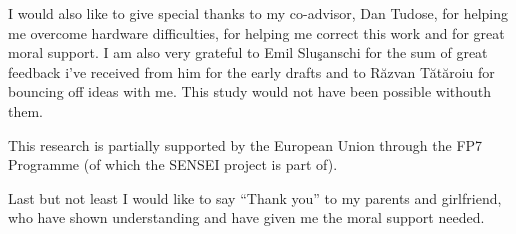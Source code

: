 I would also like to give special thanks to my co-advisor, Dan Tudose, for helping me overcome hardware difficulties, for
helping me correct this work and for great moral support. I am also very grateful to Emil Slu\c{s}anschi for the sum of great
feedback i've received from him for the early drafts and to R\u{a}zvan T\u{a}t\u{a}roiu for bouncing off ideas with me. This study would
not have been possible withouth them.

This research is partially supported by the European Union through the FP7 Programme (of which the SENSEI project is part of).

Last but not least I would like to say ``Thank you'' to my parents and girlfriend, who have shown understanding and have given me
the moral support needed.



